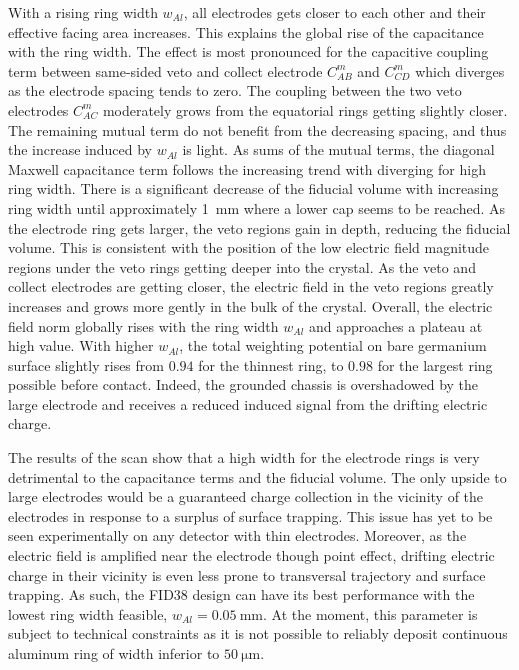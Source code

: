 With a rising ring width $w_{Al}$, all electrodes gets closer to each other and their effective facing area increases. This explains the global rise of the capacitance with the ring width. The effect is most pronounced for the capacitive coupling term between same-sided veto and collect electrode $C_{AB}^m$ and $C_{CD}^m$ which diverges as the electrode spacing tends to zero. The coupling between the two veto electrodes $C_{AC}^m$ moderately grows from the equatorial rings getting slightly closer. The remaining mutual term do not benefit from the decreasing spacing, and thus the increase induced by $w_{Al}$ is light. As sums of the mutual terms, the diagonal Maxwell capacitance term follows the increasing trend with diverging for high ring width.
There is a significant decrease of the fiducial volume with increasing ring width until approximately \SI{1}{\mm} where a lower cap seems to be reached. As the electrode ring gets larger, the veto regions gain in depth, reducing the fiducial volume. 
This is consistent with the position of the low electric field magnitude regions under the veto rings getting deeper into the crystal. As the veto and collect electrodes are getting closer, the electric field in the veto regions greatly increases and grows more gently in the bulk of the crystal. Overall, the electric field norm globally rises with the ring width $w_{Al}$ and approaches a plateau at high value. 
With higher $w_{Al}$, the total weighting potential on bare germanium surface slightly rises from $0.94$ for the thinnest ring, to $0.98$ for the largest ring possible before contact. Indeed, the grounded chassis is overshadowed by the large electrode and receives a reduced induced signal from the drifting electric charge.

The results of the scan show that a high width for the electrode rings is very detrimental to the capacitance terms and the fiducial volume. The only upside to large electrodes would be a guaranteed charge collection in the vicinity of the electrodes in response to a surplus of surface trapping. This issue has yet to be seen experimentally on any detector with thin electrodes. Moreover, as the electric field is amplified near the electrode though point effect, drifting electric charge in their vicinity is even less prone to transversal trajectory and surface trapping. As such, the FID38 design can have its best performance with the lowest ring width feasible, $w_{Al}=\SI{0.05}{\mm}$. At the moment, this parameter is subject to technical constraints as it is not possible to reliably deposit continuous aluminum ring of width inferior to $\SI{50}{\micro\meter}$. 


